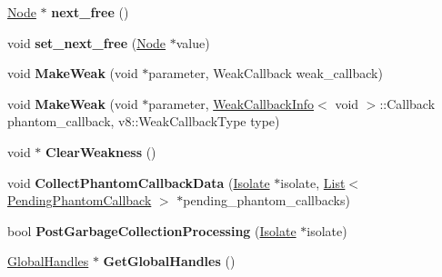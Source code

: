 \begin{DoxyCompactItemize}
\item 
\hyperlink{classv8_1_1internal_1_1_global_handles_1_1_node}{Node} $\ast$ {\bfseries next\+\_\+free} ()\hypertarget{classv8_1_1internal_1_1_global_handles_1_1_node_a3c316b1fc6a3d0520e03dd1c81606cbc}{}\label{classv8_1_1internal_1_1_global_handles_1_1_node_a3c316b1fc6a3d0520e03dd1c81606cbc}

\item 
void {\bfseries set\+\_\+next\+\_\+free} (\hyperlink{classv8_1_1internal_1_1_global_handles_1_1_node}{Node} $\ast$value)\hypertarget{classv8_1_1internal_1_1_global_handles_1_1_node_af10c1ad6d2969bd15bb7843c7beb4452}{}\label{classv8_1_1internal_1_1_global_handles_1_1_node_af10c1ad6d2969bd15bb7843c7beb4452}

\item 
void {\bfseries Make\+Weak} (void $\ast$parameter, Weak\+Callback weak\+\_\+callback)\hypertarget{classv8_1_1internal_1_1_global_handles_1_1_node_af146205ac78bc2d767d1c00f61069f96}{}\label{classv8_1_1internal_1_1_global_handles_1_1_node_af146205ac78bc2d767d1c00f61069f96}

\item 
void {\bfseries Make\+Weak} (void $\ast$parameter, \hyperlink{classv8_1_1_weak_callback_info}{Weak\+Callback\+Info}$<$ void $>$\+::Callback phantom\+\_\+callback, v8\+::\+Weak\+Callback\+Type type)\hypertarget{classv8_1_1internal_1_1_global_handles_1_1_node_a60e6a1e4751374ef030ac0ccea784c19}{}\label{classv8_1_1internal_1_1_global_handles_1_1_node_a60e6a1e4751374ef030ac0ccea784c19}

\item 
void $\ast$ {\bfseries Clear\+Weakness} ()\hypertarget{classv8_1_1internal_1_1_global_handles_1_1_node_ad2abb4476219d95838cfb9110030a1e6}{}\label{classv8_1_1internal_1_1_global_handles_1_1_node_ad2abb4476219d95838cfb9110030a1e6}

\item 
void {\bfseries Collect\+Phantom\+Callback\+Data} (\hyperlink{classv8_1_1internal_1_1_isolate}{Isolate} $\ast$isolate, \hyperlink{classv8_1_1internal_1_1_list}{List}$<$ \hyperlink{classv8_1_1internal_1_1_global_handles_1_1_pending_phantom_callback}{Pending\+Phantom\+Callback} $>$ $\ast$pending\+\_\+phantom\+\_\+callbacks)\hypertarget{classv8_1_1internal_1_1_global_handles_1_1_node_adb4f470094f66644d38ee6551783d614}{}\label{classv8_1_1internal_1_1_global_handles_1_1_node_adb4f470094f66644d38ee6551783d614}

\item 
bool {\bfseries Post\+Garbage\+Collection\+Processing} (\hyperlink{classv8_1_1internal_1_1_isolate}{Isolate} $\ast$isolate)\hypertarget{classv8_1_1internal_1_1_global_handles_1_1_node_af5f7bb202ad8da637eb3bf84f55513a4}{}\label{classv8_1_1internal_1_1_global_handles_1_1_node_af5f7bb202ad8da637eb3bf84f55513a4}

\item 
\hyperlink{classv8_1_1internal_1_1_global_handles}{Global\+Handles} $\ast$ {\bfseries Get\+Global\+Handles} ()\hypertarget{classv8_1_1internal_1_1_global_handles_1_1_node_a0ca4bb19bd0b3d379861815ab229d656}{}\label{classv8_1_1internal_1_1_global_handles_1_1_node_a0ca4bb19bd0b3d379861815ab229d656}

\end{DoxyCompactItemize}
